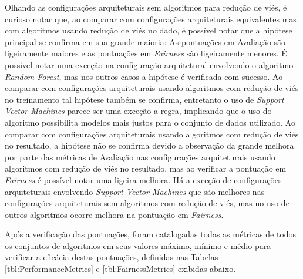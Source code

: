 \documentclass[Portugues,Final]{ic-tese-v3}
\begin{document}
Olhando as configurações arquiteturais sem algoritmos para redução de viés, é curioso notar que, ao comparar com configurações arquiteturais equivalentes mas com algoritmos usando redução de viés no dado, é possível notar que a hipótese principal se confirma em sua grande maioria: As pontuações em Avaliação são ligeiramente maiores e as pontuações em \textit{Fairness} são ligeiramente menores. É possível notar uma exceção na configuração arquitetural envolvendo o algoritmo \textit{Random Forest}, mas nos outros casos a hipótese é verificada com sucesso. Ao comparar com configurações arquiteturais usando algoritmos com redução de viés no treinamento tal hipótese também se confirma, entretanto o uso de \textit{Support Vector Machines} parece ser uma exceção a regra, implicando que o uso do algoritmo possibilita modelos mais justos para o conjunto de dados utilizado. Ao comparar com configurações arquiteturais usando algoritmos com redução de viés no resultado, a hipótese não se confirma devido a observação da grande melhora por parte das métricas de Avaliação nas configurações arquiteturais usando algoritmos com redução de viés no resultado, mas ao verificar a pontuação em \textit{Fairness} é possível notar uma ligeira melhora. Há a exceção de configurações arquiteturais envolvendo \textit{Support Vector Machines} que são melhores nas configurações arquiteturais sem algoritmos com redução de viés, mas no uso de outros algoritmos ocorre melhora na pontuação em \textit{Fairness}.

Após a verificação das pontuações, foram catalogadas todas as métricas de todos os conjuntos de algoritmos em seus valores máximo, mínimo e médio para verificar a eficácia destas pontuações, definidas nas Tabelas \ref{tbl:PerformanceMetrics} e \ref{tbl:FairnessMetrics} exibidas abaixo.
\end{document}
